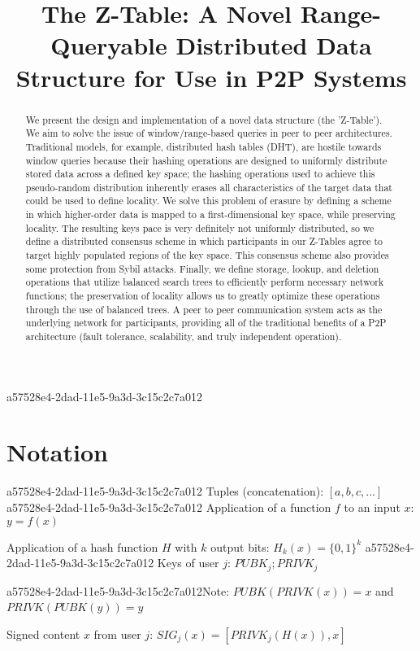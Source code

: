 \documentclass[12pt]{article}
\title{The Z-Table: A Novel Range-Queryable Distributed Data Structure for Use in P2P Systems}
\begin{document}
\maketitle

\begin{abstract}
We present the design and implementation of a novel data structure (the 'Z-Table'). We aim to solve the issue of window/range-based queries in peer to peer architectures. Traditional models, for example,  distributed hash tables (DHT), are hostile towards window queries because their hashing operations are designed to uniformly distribute stored data across a defined key space; the hashing operations used to achieve this pseudo-random distribution inherently erases all characteristics of the target data that could be used to define locality. We solve this problem of erasure by defining a scheme in which higher-order data is mapped to a first-dimensional key space, while preserving locality. The resulting keys pace is very definitely not uniformly distributed, so we define a distributed consensus scheme in which participants in our Z-Tables agree to target highly populated regions of the key space. This consensus scheme also provides some protection from Sybil attacks. Finally, we define storage, lookup, and deletion operations that utilize balanced search trees to efficiently perform necessary network functions; the preservation of locality allows us to greatly optimize these operations through the use of balanced trees. A peer to peer communication system acts as the underlying network for participants, providing all of the traditional benefits of a P2P architecture (fault tolerance, scalability, and truly independent operation).
\end{abstract}
a57528e4-2dad-11e5-9a3d-3c15c2c7a012
\section{Notation}
a57528e4-2dad-11e5-9a3d-3c15c2c7a012
Tuples (concatenation): $[a,b,c,...]$
a57528e4-2dad-11e5-9a3d-3c15c2c7a012
Application of a function $f$ to an input $x$: $y=f(x)$

Application of a hash function $H$ with $k$ output bits: $H_{k}(x) = \{0,1\}^k$
a57528e4-2dad-11e5-9a3d-3c15c2c7a012
Keys of user $j$: $ PUBK_j; PRIVK_j $

a57528e4-2dad-11e5-9a3d-3c15c2c7a012Note: $PUBK(PRIVK(x)) = x$ and $PRIVK(PUBK(y)) = y$~

Signed content $x$ from user $j$: $SIG_j(x) = \left[ PRIVK_j( H(x) ), x \right]$
\end{document}
